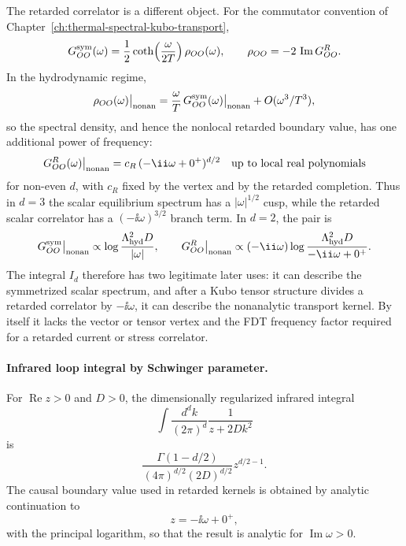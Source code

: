 The retarded correlator is a different object.  For the commutator convention
of Chapter~\ref{ch:thermal-spectral-kubo-transport},
\[
  G^{\rm sym}_{OO}(\omega)
  =
  \frac12\coth\!\left(\frac{\omega}{2T}\right)\rho_{OO}(\omega),
  \qquad
  \rho_{OO}=-2\,\operatorname{Im}G^R_{OO}.
\]
In the hydrodynamic regime,
\begin{equation}
  \rho_{OO}(\omega)\big|_{\rm nonan}
  =
  \frac{\omega}{T}\,
  G^{\rm sym}_{OO}(\omega)\big|_{\rm nonan}
  +O(\omega^3/T^3),
  \label{eq:hydro-fluct-fdt-extra-frequency}
\end{equation}
so the spectral density, and hence the nonlocal retarded boundary value, has
one additional power of frequency:
\begin{equation}
  G^R_{OO}(\omega)\big|_{\rm nonan}
  =
  c_R\,(-\ii\omega+0^+)^{d/2}
  \quad
  \text{up to local real polynomials}
  \label{eq:hydro-fluct-retarded-exponent-shift}
\end{equation}
for non-even \(d\), with \(c_R\) fixed by the vertex and by the retarded
completion.  Thus in \(d=3\) the scalar equilibrium spectrum has a
\(|\omega|^{1/2}\) cusp, while the retarded scalar correlator has a
\((- \ii\omega)^{3/2}\) branch term.  In \(d=2\), the pair is
\begin{equation}
  G^{\rm sym}_{OO}\big|_{\rm nonan}\propto
  \log\frac{\Lambda_{\rm hyd}^2D}{|\omega|},
  \qquad
  G^R_{OO}\big|_{\rm nonan}\propto
  (-\ii\omega)\log\frac{\Lambda_{\rm hyd}^2D}{-\ii\omega+0^+}.
  \label{eq:hydro-fluct-d2-fdt-log-pair}
\end{equation}
The integral \(I_d\) therefore has two legitimate later uses: it can describe
the symmetrized scalar spectrum, and after a Kubo tensor structure divides a
retarded correlator by \(-\ii\omega\), it can describe the nonanalytic
transport kernel.  By itself it lacks the vector or tensor vertex and the FDT
frequency factor required for a retarded current or stress correlator.

\paragraph{Infrared loop integral by Schwinger parameter.}
For \(\operatorname{Re}z>0\) and \(D>0\), the dimensionally regularized
infrared integral
\begin{equation}
  \int\frac{d^dk}{(2\pi)^d}\frac{1}{z+2Dk^2}
  \label{eq:hydro-fluct-dimreg-loop-start}
\end{equation}
is
\begin{equation}
  \frac{\Gamma(1-d/2)}{(4\pi)^{d/2}(2D)^{d/2}}z^{d/2-1}.
  \label{eq:hydro-fluct-dimreg-loop-derived}
\end{equation}
The causal boundary value used in retarded kernels is obtained by analytic
continuation to
\begin{equation}
  z=-\ii\omega+0^+,
  \label{eq:hydro-fluct-retarded-z-branch}
\end{equation}
with the principal logarithm, so that the result is analytic for
\(\operatorname{Im}\omega>0\).

